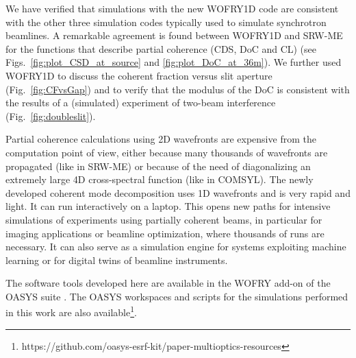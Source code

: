 \documentclass[preprint]{iucr}
\newcommand{\inred}[1]{{\color{red}#1}}
\begin{document}
We have verified that simulations with the new WOFRY1D code are consistent with the other three simulation codes typically used to simulate synchrotron beamlines.
A remarkable agreement is found between WOFRY1D and SRW-ME for the functions that describe partial coherence (CDS, DoC and CL) (see Figs.~\ref{fig:plot_CSD_at_source} and \ref{fig:plot_DoC_at_36m}).
We further used WOFRY1D to discuss the coherent fraction versus slit aperture (Fig.~\ref{fig:CFvsGap}) and to verify that the modulus of the DoC is consistent with the results of a (simulated) experiment of two-beam interference (Fig.~\ref{fig:doubleslit}). 
 
Partial coherence calculations using 2D wavefronts are expensive from the computation point of view, either because many thousands of wavefronts are propagated (like in SRW-ME) or because \inred{of} the need of diagonalizing an extremely large 4D cross-spectral function (like in COMSYL). The newly developed coherent mode decomposition uses 1D wavefronts and is very rapid and light. It can run interactively \inred{on} a laptop. This opens new paths for intensive simulations of experiments using partially coherent beams, in particular for imaging applications or beamline optimization, where thousands of runs are necessary. It can also serve as \inred{a} simulation engine for systems exploiting machine learning or for digital twins of beamline instruments. 
 
The software tools developed here are available in the WOFRY add-on of the OASYS suite \cite{codeOASYS}. The OASYS workspaces and scripts for the simulations performed in this work are also available\footnote{{ https://github.com/oasys-esrf-kit/paper-multioptics-resources}}.



\end{document}
